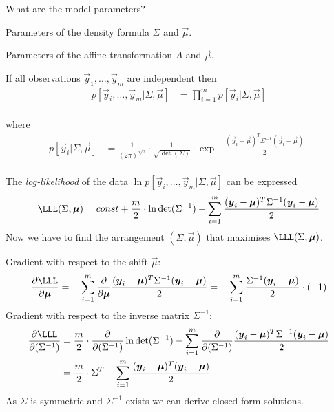 \documentclass[landscape,footrule]{foils}
\newcommand{\lastline}{\vspace*{-2ex}}
\begin{document}
What are the model parameters?
\begin{triangles}
\item Parameters of the density formula $\Sigma$ and $\vec{\mu}$.
\item Parameters of the affine transformation $A$ and $\vec{\mu}$.
\end{triangles}

If all observations $\vec{y}_1,\ldots,\vec{y}_m$ are independent then\vspace*{-0ex}
\begin{align*}
p[\vec{y}_i,\ldots,\vec{y}_m|\Sigma,\vec{\mu}]
&=\prod_{i=1}^m p[\vec{y}_i|\Sigma,\vec{\mu}]
\end{align*}\vspace*{-4ex}\\
where\vspace*{-0ex}
\begin{align*}
p[\vec{y}_i|\Sigma,\vec{\mu}]
&=\frac{1}{(2\pi)^{n/2}}\cdot\frac{1}{\sqrt{\det(\Sigma)}}\cdot
\exp{-\frac{(\vec{y}_i-\vec{\mu})^T \Sigma^{-1}(\vec{y}_i-\vec{\mu})}{2}}\enspace
\end{align*}\vspace*{-0ex}\\
The \emph{log-likelihood} of the data $\ln p[\vec{y}_i,\ldots,\vec{y}_m|\Sigma,\vec{\mu}]$ can be expressed \vspace*{-0ex}
\begin{align*}
\LLL(\Sigma,\vec{\mu})=const +\frac{m}{2}\cdot \ln\det(\Sigma^{-1}) 
-\sum_{i=1}^m\frac{(\vec{y}_i-\vec{\mu})^T \Sigma^{-1}(\vec{y}_i-\vec{\mu})}{2}
\end{align*}
Now we have to find the arrangement $(\Sigma,\vec{\mu})$ that maximises $\LLL(\Sigma,\vec{\mu})$.\lastline
 

Gradient with respect to the shift $\vec{\mu}$: 
\begin{align*}
\frac{\partial\LLL}{\partial\vec{\mu}}= -\sum_{i=1}^m\frac{\partial}{\partial\vec{\mu}}\frac{(\vec{y}_i-\vec{\mu})^T \Sigma^{-1}(\vec{y}_i-\vec{\mu})}{2}
=-\sum_{i=1}^m\frac{\Sigma^{-1}(\vec{y}_i-\vec{\mu})}{2}\cdot(-1)
\end{align*}
Gradient with respect to the inverse matrix $\Sigma^{-1}$: 
\begin{align*}
\frac{\partial\LLL}{\partial(\Sigma^{-1})}&=\frac{m}{2}\cdot \frac{\partial}{\partial(\Sigma^{-1})} \ln\det(\Sigma^{-1}) -\sum_{i=1}^m\frac{\partial}{\partial(\Sigma^{-1})}\frac{(\vec{y}_i-\vec{\mu})^T \Sigma^{-1}(\vec{y}_i-\vec{\mu})}{2}\\
&=\frac{m}{2}\cdot\Sigma^{T} -\sum_{i=1}^m\frac{(\vec{y}_i-\vec{\mu})^T (\vec{y}_i-\vec{\mu})}{2}
\end{align*}
As $\Sigma$ is symmetric and $\Sigma^{-1}$ exists we can derive closed form solutions.
\end{document}
